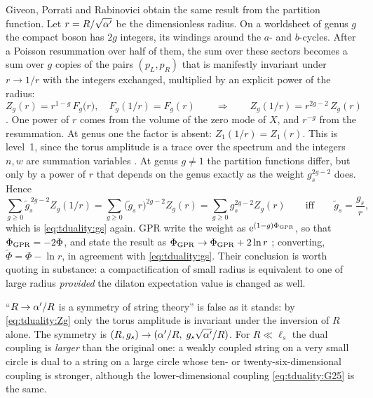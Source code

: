 Giveon, Porrati and Rabinovici obtain the same result from the partition function. Let $r=R/\sqrt{\alpha'}$
be the dimensionless radius. On a worldsheet of genus $g$ the compact boson has $2g$
integers, its windings around the $a$- and $b$-cycles. After a Poisson resummation over half of
them, the sum over these sectors becomes a sum over $g$ copies of the pairs $(p_L,p_R)$ that is
manifestly invariant under $r\to1/r$ with the integers exchanged, multiplied by an explicit
power of the radius:
\begin{equation}\label{eq:tduality:Zg}
  Z_g(r)=r^{1-g}\,F_g\big(r\big),\quad F_g(1/r)=F_g(r)\qquad\Longrightarrow\qquad
  Z_g(1/r)=r^{2g-2}\,Z_g(r)
\end{equation}
. One power of $r$ comes from the volume of
the zero mode of $X$, and $r^{-g}$ from the resummation. At genus one the factor is absent:
$Z_1(1/r)=Z_1(r)$. This is level~1, since the torus amplitude is a trace over the spectrum
and the integers $n,w$ are summation variables . At genus
$g\ne1$ the partition functions differ, but only by a power of $r$ that depends on the
genus exactly as the weight $g_s^{2g-2}$ does. Hence
\begin{equation}\label{eq:tduality:Zfull}
  \sum_{g\ge0}\tilde g_s^{\,2g-2}Z_g(1/r)=\sum_{g\ge0}\big(\tilde g_s\,r\big)^{2g-2}Z_g(r)
  =\sum_{g\ge0}g_s^{2g-2}Z_g(r)\qquad\text{iff}\qquad\tilde g_s=\frac{g_s}{r},
\end{equation}
which is \eqref{eq:tduality:gs} again. GPR write the weight as $\mathrm{e}^{(1-g)\Phi_{\rm GPR}}$, so that
$\Phi_{\rm GPR}=-2\Phi$, and state the result as $\Phi_{\rm GPR}\to\Phi_{\rm GPR}+2\ln r$
; converting, $\tilde\Phi=\Phi-\ln r$, in
agreement with \eqref{eq:tduality:gs}. Their conclusion is worth quoting in substance: a
compactification of small radius is equivalent to one of large radius \emph{provided} the
dilaton expectation value is changed as well.

\begin{pitfallbox}
``$R\to\alpha'/R$ is a symmetry of string theory'' is false as it stands: by
\eqref{eq:tduality:Zg} only the torus amplitude is invariant under the inversion of $R$ alone. The
symmetry is $(R,g_s)\to(\alpha'/R,\;g_s\sqrt{\alpha'}/R)$. For $R\ll\ell_s$ the dual coupling is
\emph{larger} than the original one: a weakly coupled string on a very small circle is dual to
a string on a large circle whose ten- or twenty-six-dimensional coupling is stronger, although
the lower-dimensional coupling \eqref{eq:tduality:G25} is the same.
\end{pitfallbox}

